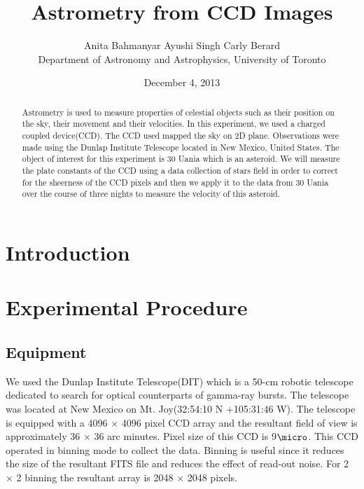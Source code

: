 \documentclass[letterpaper,12pt]{article}
\title{Astrometry from CCD Images }
\author{Anita Bahmanyar \qquad Ayushi Singh \qquad Carly Berard \\Department of Astronomy and Astrophysics, University of Toronto}
\affil{\small {anita.bahmanyar@mail.utoronto.ca}}
\date{December 4, 2013}
\begin{document}
\maketitle

\begin{abstract}
\label{abstract}
Astrometry is used to measure properties of celestial objects such as their position on the sky, their movement and their velocities. In this experiment, we used a charged coupled device(CCD). The CCD used mapped the sky on 2D plane. Observations were made using the Dunlap Institute Telescope located in New Mexico, United States. The object of interest for this experiment is 30 Uania which is an asteroid. We will measure the plate constants of the CCD using a data collection of stars field in order to correct for the sheerness of the CCD pixels and then we apply it to the data from 30 Uania over the course of three nights to measure the velocity of this asteroid.

\end{abstract}

\section{Introduction}
\label{sec:introduction}



\section{Experimental Procedure}
\label{sec:experimental procedure}
\subsection{Equipment}
We used the Dunlap Institute Telescope(DIT) which is a 50-cm robotic telescope dedicated to search for optical counterparts of gamma-ray bursts. The telescope was located at New Mexico on Mt. Joy(32:54:10 N +105:31:46 W).  The telescope is equipped with a 4096 \begin{math}\times\end{math} 4096 pixel CCD array and the resultant field of view is approximately 36 \begin{math}\times\end{math} 36 arc minutes. Pixel size of this CCD is 9\begin{math}\micro\end{math}. This CCD operated in binning mode to collect the data. Binning is useful since it reduces the size of the resultant FITS file and reduces the effect of read-out noise. For 2 \begin{math}\times\end{math} 2 binning the resultant array is 2048 \begin{math}\times\end{math} 2048 pixels.
\end{document}
